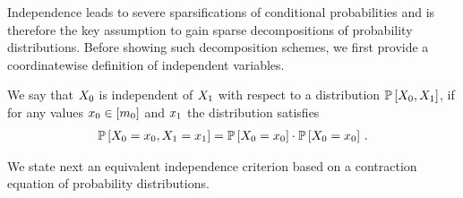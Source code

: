 
Independence leads to severe sparsifications of conditional probabilities and is therefore the key assumption to gain sparse decompositions of probability distributions.
Before showing such decomposition schemes, we first provide a coordinatewise definition of independent variables.

\begin{definition}[Independence]
    \label{def:independence}
    We say that $X_{0}$ is independent of $X_{1}$ with respect to a distribution $\mathbb{P}\left[X_{0},X_{1}\right]$, if for any values $x_{0}\in[m_{0}]$ and $x_{1}$ the distribution satisfies
    \begin{align*}
        \mathbb{P}\left[X_{0}=x_{0},X_{1}=x_{1}\right]
        = \mathbb{P}\left[X_{0}=x_{0}\right]\cdot\mathbb{P}\left[X_{0}=x_{0}\right] \, .
    \end{align*}
\end{definition}

We state next an equivalent independence criterion based on a contraction equation of probability distributions.

